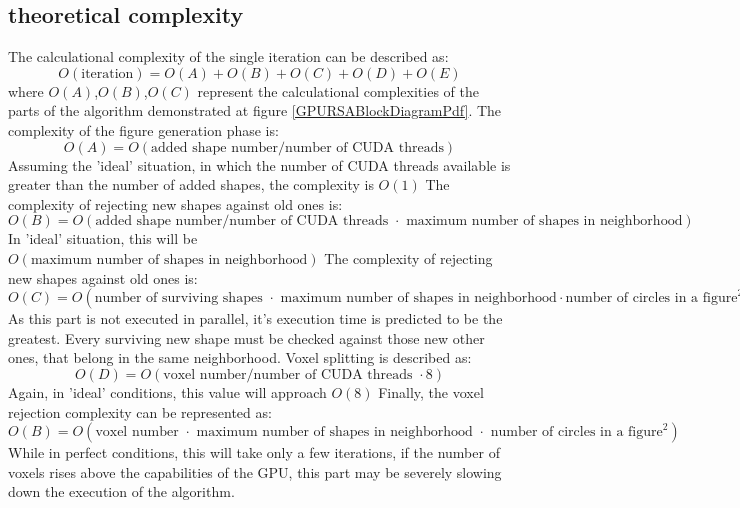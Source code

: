 \documentclass[12pt, oneside]{report}
\begin{document}
\subsection{theoretical complexity}

The calculational complexity of the single iteration can be described as: \newline
\begin{equation*}
	O(\text{iteration}) = O(A)+O(B)+O(C)+O(D)+O(E)
\end{equation*}
where $O(A)$,$O(B)$,$O(C)$ represent the calculational complexities of the parts of the algorithm demonstrated at figure \ref{GPURSABlockDiagramPdf}. The complexity of the figure generation phase is:
\begin{equation*}
	O(A) = O(\text{added shape number}/ \text{number of CUDA threads})
\end{equation*}
Assuming the 'ideal' situation, in which the number of CUDA threads available is greater than the number of added shapes, the complexity is $O(1)$ \newline
The complexity of rejecting new shapes against old ones is: \newline
\begin{equation*}
	O(B) = O(\text{added shape number}/ \text{number of CUDA threads } \cdot \text{ maximum number of shapes in neighborhood})
\end{equation*}
In 'ideal' situation, this will be $O(\text{maximum number of shapes in neighborhood})$ \newline
The complexity of rejecting new shapes against old ones is: \newline
\begin{equation*}
	O(C) = O(\text{number of surviving shapes } \cdot \text{ maximum number of shapes in neighborhood} \cdot \text{number of circles in a figure}^2)
\end{equation*}
As this part is not executed in parallel, it's execution time is predicted to be the greatest. Every surviving new shape must be checked against those new other ones, that belong in the same neighborhood. \newline
Voxel splitting is described as: \newline
\begin{equation*}
	O(D) = O(\text{voxel number}/ \text{number of CUDA threads } \cdot 8)
\end{equation*}
Again, in 'ideal' conditions, this value will approach $O(8)$ \newline
Finally, the voxel rejection complexity can be represented as:
\begin{equation*}
	O(B) = O(\text{voxel number } \cdot \text{ maximum number of shapes in neighborhood } \cdot \text{ number of circles in a figure}^2)
\end{equation*}
While in perfect conditions, this will take only a few iterations, if the number of voxels rises above the capabilities of the GPU, this part may be severely slowing down the execution of the algorithm.
\end{document}
